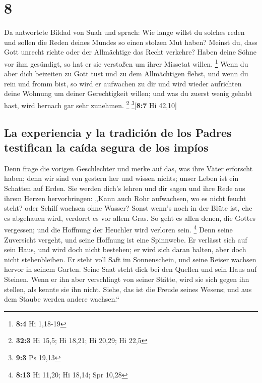 \hypertarget{section-7}{%
\section{8}\label{section-7}}

 Da antwortete Bildad von Suah und sprach: 
Wie lange willst du solches reden und sollen die Reden deines Mundes so
einen stolzen Mut haben?  Meinst du, dass Gott unrecht
richte oder der Allmächtige das Recht verkehre?  Haben
deine Söhne vor ihm gesündigt, so hat er sie verstoßen um ihrer Missetat
willen. \footnote{\textbf{8:4} Hi 1,18-19}  Wenn du aber
dich beizeiten zu Gott tust und zu dem Allmächtigen flehst,
 und wenn du rein und fromm bist, so wird er aufwachen zu
dir und wird wieder aufrichten deine Wohnung um deiner Gerechtigkeit
willen;  und was du zuerst wenig gehabt hast, wird hernach
gar sehr zunehmen. \footnote{\textbf{32:3} Hi 15,5; Hi 18,21; Hi 20,29;
  Hi 22,5} \footnote{\textbf{9:3} Ps 19,13}{[}\textbf{8:7} Hi 42,10{]}

\hypertarget{la-experiencia-y-la-tradiciuxf3n-de-los-padres-testifican-la-cauxedda-segura-de-los-impuxedos}{%
\subsection{La experiencia y la tradición de los Padres testifican la
caída segura de los
impíos}\label{la-experiencia-y-la-tradiciuxf3n-de-los-padres-testifican-la-cauxedda-segura-de-los-impuxedos}}

 Denn frage die vorigen Geschlechter und merke auf das,
was ihre Väter erforscht haben;  denn wir sind von gestern
her und wissen nichts; unser Leben ist ein Schatten auf Erden.
 Sie werden dich's lehren und dir sagen und ihre Rede aus
ihrem Herzen hervorbringen:  „Kann auch Rohr aufwachsen,
wo es nicht feucht steht? oder Schilf wachsen ohne Wasser?
 Sonst wenn's noch in der Blüte ist, ehe es abgehauen
wird, verdorrt es vor allem Gras.  So geht es allen
denen, die Gottes vergessen; und die Hoffnung der Heuchler wird verloren
sein. \footnote{\textbf{8:13} Hi 11,20; Hi 18,14; Spr 10,28}
 Denn seine Zuversicht vergeht, und seine Hoffnung ist
eine Spinnwebe.  Er verlässt sich auf sein Haus, und wird
doch nicht bestehen; er wird sich daran halten, aber doch nicht
stehenbleiben.  Er steht voll Saft im Sonnenschein, und
seine Reiser wachsen hervor in seinem Garten.  Seine Saat
steht dick bei den Quellen und sein Haus auf Steinen. 
Wenn er ihn aber verschlingt von seiner Stätte, wird sie sich gegen ihn
stellen, als kennte sie ihn nicht.  Siehe, das ist die
Freude seines Wesens; und aus dem Staube werden andere wachsen.``


